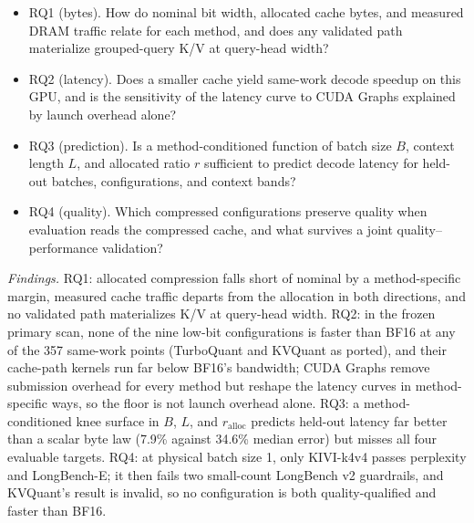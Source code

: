 \documentclass{article}
\begin{document}
\begin{itemize}
\item RQ1 (bytes).
How do nominal bit width, allocated cache bytes, and measured DRAM traffic relate for each method, and does any validated path materialize grouped-query K/V at query-head width?
\item RQ2 (latency).
Does a smaller cache yield same-work decode speedup on this GPU, and is the sensitivity of the latency curve to CUDA Graphs explained by launch overhead alone?
\item RQ3 (prediction).
Is a method-conditioned function of batch size $B$, context length $L$, and allocated ratio $r$ sufficient to predict decode latency for held-out batches, configurations, and context bands?
\item RQ4 (quality).
Which compressed configurations preserve quality when evaluation reads the compressed cache, and what survives a joint quality--performance validation?
\end{itemize}

\textit{Findings.} RQ1: allocated compression falls short of nominal by a method-specific margin, measured cache traffic departs from the allocation in both directions, and no validated path materializes K/V at query-head width.
RQ2: in the frozen primary scan, none of the nine low-bit configurations is faster than BF16 at any of the 357 same-work points (TurboQuant and KVQuant as ported), and their cache-path kernels run far below BF16's bandwidth; CUDA Graphs remove submission overhead for every method but reshape the latency curves in method-specific ways, so the floor is not launch overhead alone.
RQ3: a method-conditioned knee surface in $B$, $L$, and $r_{\mathrm{alloc}}$ predicts held-out latency far better than a scalar byte law (7.9\% against 34.6\% median error) but misses all four evaluable targets.
RQ4: at physical batch size 1, only KIVI-k4v4 passes perplexity and LongBench-E; it then fails two small-count LongBench v2 guardrails, and KVQuant's result is invalid, so no configuration is both quality-qualified and faster than BF16.
\end{document}
